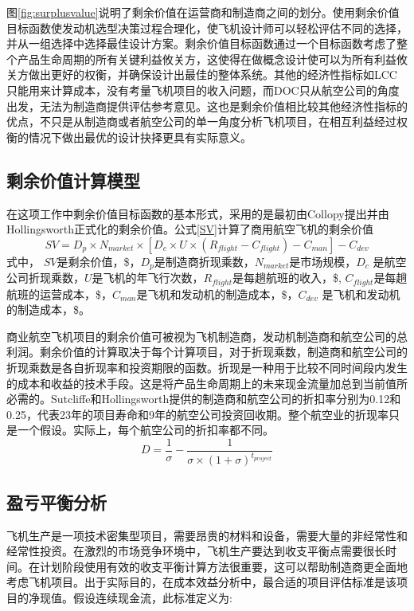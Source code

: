 \documentclass[12pt,a4paper]{report}
\begin{document}
图\ref{fig:surplusvalue}说明了剩余价值在运营商和制造商之间的划分。使用剩余价值目标函数使发动机选型决策过程合理化，使飞机设计师可以轻松评估不同的选择，并从一组选择中选择最佳设计方案。剩余价值目标函数通过一个目标函数考虑了整个产品生命周期的所有关键利益攸关方，这使得在做概念设计使可以为所有利益攸关方做出更好的权衡，并确保设计出最佳的整体系统。其他的经济性指标如LCC只能用来计算成本，没有考量飞机项目的收入问题，而DOC只从航空公司的角度出发，无法为制造商提供评估参考意见。这也是剩余价值相比较其他经济性指标的优点，不只是从制造商或者航空公司的单一角度分析飞机项目，在相互利益经过权衡的情况下做出最优的设计抉择更具有实际意义。

\subsection{剩余价值计算模型}
在这项工作中剩余价值目标函数的基本形式，采用的是最初由Collopy\cite{collopy1997surplus}提出并由Hollingsworth\cite{hollingsworth2011investigation}正式化的剩余价值。公式\ref{SV}计算了商用航空飞机的剩余价值
\begin{equation}
\label{SV}
SV=D_p \times N_{market}\times [D_c \times U \times (R_{flight}-C_{flight})-C_{man}]-C_{dev}
\end{equation}
式中， $SV$是剩余价值，\$，$D_p$是制造商折现乘数，$N_{market}$是市场规模，$D_c$ 是航空公司折现乘数，$U$是飞机的年飞行次数，$R_{flight}$是每趟航班的收入，\$, $C_{flight}$是每趟航班的运营成本，\$，$C_{man}$是飞机和发动机的制造成本，\$，$C_{dev}$ 是飞机和发动机的制造成本，\$。

商业航空飞机项目的剩余价值可被视为飞机制造商，发动机制造商和航空公司的总利润。剩余价值的计算取决于每个计算项目，对于折现乘数，制造商和航空公司的折现乘数是各自折现率和投资期限的函数。折现是一种用于比较不同时间段内发生的成本和收益的技术手段。这是将产品生命周期上的未来现金流量加总到当前值所必需的。Sutcliffe和Hollingsworth\cite{sutcliffe2010development}提供的制造商和航空公司的折扣率分别为0.12和0.25，代表23年的项目寿命和9年的航空公司投资回收期。整个航空业的折现率只是一个假设。实际上，每个航空公司的折扣率都不同。
\begin{equation}
\label{discountfactor}
D=\frac{1}{\sigma}-\frac{1}{\sigma \times(1+\sigma)^{t_{project}}}
\end{equation}

\subsection{盈亏平衡分析}
飞机生产是一项技术密集型项目，需要昂贵的材料和设备，需要大量的非经常性和经常性投资。在激烈的市场竞争环境中，飞机生产要达到收支平衡点需要很长时间。在计划阶段使用有效的收支平衡计算方法很重要，这可以帮助制造商更全面地考虑飞机项目。出于实际目的，在成本效益分析中，最合适的项目评估标准是该项目的净现值。假设连续现金流，此标准定义为\cite{lammering2012aircraft}:
\end{document}
